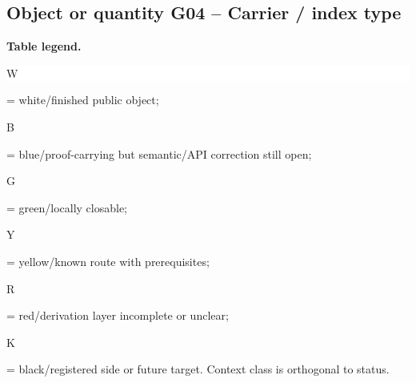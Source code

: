 \subsection*{Object or quantity G04 -- Carrier /\allowbreak{} index type}
\hypertarget{objproof:G04}{}
\par\smallskip\noindent\begin{minipage}{0.99\linewidth}\footnotesize\raggedright\textbf{Table legend.} \colorbox{white}{\strut W} = white/finished public object; \colorbox{cyan!20}{\strut B} = blue/proof-carrying but semantic/API correction still open; \colorbox{green!18}{\strut G} = green/locally closable; \colorbox{yellow!25}{\strut Y} = yellow/known route with prerequisites; \colorbox{red!20}{\strut R} = red/derivation layer incomplete or unclear; \colorbox{black!18}{\strut K} = black/registered side or future target. Context class is orthogonal to status.\end{minipage}\par\vspace{0.25em}
